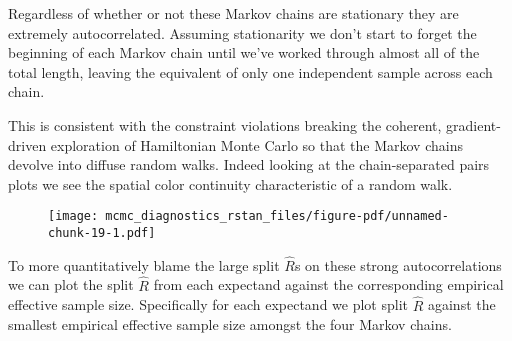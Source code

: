 \documentclass[
  letterpaper,
  DIV=11,
  numbers=noendperiod]{scrartcl}
\newenvironment{Shaded}{\begin{snugshade}}{\end{snugshade}}
\newcommand{\FunctionTok}[1]{\textcolor[rgb]{0.28,0.35,0.67}{#1}}
\newcommand{\NormalTok}[1]{\textcolor[rgb]{0.00,0.23,0.31}{#1}}
\newcommand{\SpecialCharTok}[1]{\textcolor[rgb]{0.37,0.37,0.37}{#1}}
\newcommand{\StringTok}[1]{\textcolor[rgb]{0.13,0.47,0.30}{#1}}
\begin{document}
Regardless of whether or not these Markov chains are stationary they are
extremely autocorrelated. Assuming stationarity we don't start to forget
the beginning of each Markov chain until we've worked through almost all
of the total length, leaving the equivalent of only one independent
sample across each chain.

This is consistent with the constraint violations breaking the coherent,
gradient-driven exploration of Hamiltonian Monte Carlo so that the
Markov chains devolve into diffuse random walks. Indeed looking at the
chain-separated pairs plots we see the spatial color continuity
characteristic of a random walk.

\begin{Shaded}
\end{Shaded}

\begin{figure}[H]

{\centering \texttt{[image: mcmc\_diagnostics\_rstan\_files/figure-pdf/unnamed-chunk-19-1.pdf]}

}

\end{figure}

To more quantitatively blame the large split \(\hat{R}\)s on these
strong autocorrelations we can plot the split \(\hat{R}\) from each
expectand against the corresponding empirical effective sample size.
Specifically for each expectand we plot split \(\hat{R}\) against the
smallest empirical effective sample size amongst the four Markov chains.
\end{document}

